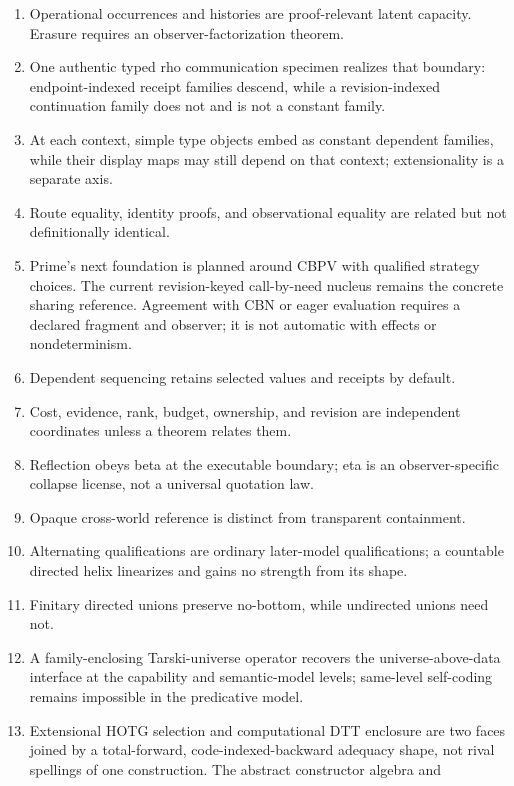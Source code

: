 \documentclass[11pt]{article}
\theoremstyle{definition}
\theoremstyle{remark}
\begin{document}
\begin{enumerate}
\item Operational occurrences and histories are proof-relevant latent capacity.
  Erasure requires an observer-factorization theorem.
\item One authentic typed rho communication specimen realizes that boundary:
  endpoint-indexed receipt families descend, while a revision-indexed
  continuation family does not and is not a constant family.
\item At each context, simple type objects embed as constant dependent
  families, while their display maps may still depend on that context;
  extensionality is a separate axis.
\item Route equality, identity proofs, and observational equality are related but
  not definitionally identical.
\item Prime's next foundation is planned around CBPV with qualified strategy
  choices. The current revision-keyed call-by-need nucleus remains the concrete
  sharing reference. Agreement with CBN or eager evaluation requires a declared
  fragment and observer; it is not automatic with effects or nondeterminism.
\item Dependent sequencing retains selected values and receipts by default.
\item Cost, evidence, rank, budget, ownership, and revision are independent
  coordinates unless a theorem relates them.
\item Reflection obeys beta at the executable boundary; eta is an
  observer-specific collapse license, not a universal quotation law.
\item Opaque cross-world reference is distinct from transparent containment.
\item Alternating qualifications are ordinary later-model qualifications; a
  countable directed helix linearizes and gains no strength from its shape.
\item Finitary directed unions preserve no-bottom, while undirected unions need
  not.
\item A family-enclosing Tarski-universe operator recovers the
  universe-above-data interface at the capability and semantic-model levels;
  same-level self-coding remains impossible in the predicative model.
\item Extensional HOTG selection and computational DTT enclosure are two faces
  joined by a total-forward, code-indexed-backward adequacy shape, not
  rival spellings of one construction.  The abstract constructor algebra and

\end{enumerate}
\end{document}

